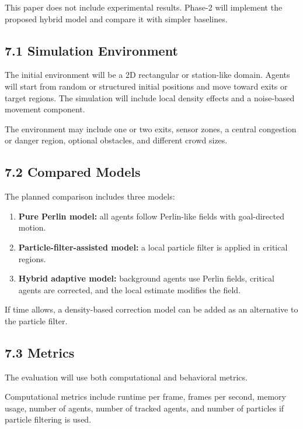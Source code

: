 \documentclass[
  11pt,
]{article}
\providecommand{\tightlist}{%
  \setlength{\itemsep}{0pt}\setlength{\parskip}{0pt}}
\begin{document}
This paper does not include experimental results. Phase-2 will implement
the proposed hybrid model and compare it with simpler baselines.

\subsection{7.1 Simulation Environment}\label{simulation-environment}

The initial environment will be a 2D rectangular or station-like domain.
Agents will start from random or structured initial positions and move
toward exits or target regions. The simulation will include local
density effects and a noise-based movement component.

The environment may include one or two exits, sensor zones, a central
congestion or danger region, optional obstacles, and different crowd
sizes.

\subsection{7.2 Compared Models}\label{compared-models}

The planned comparison includes three models:

\begin{enumerate}
\def\labelenumi{\arabic{enumi}.}
\tightlist
\item
  \textbf{Pure Perlin model:} all agents follow Perlin-like fields with
  goal-directed motion.
\item
  \textbf{Particle-filter-assisted model:} a local particle filter is
  applied in critical regions.
\item
  \textbf{Hybrid adaptive model:} background agents use Perlin fields,
  critical agents are corrected, and the local estimate modifies the
  field.
\end{enumerate}

If time allows, a density-based correction model can be added as an
alternative to the particle filter.

\subsection{7.3 Metrics}\label{metrics}

The evaluation will use both computational and behavioral metrics.

Computational metrics include runtime per frame, frames per second,
memory usage, number of agents, number of tracked agents, and number of
particles if particle filtering is used.
\end{document}
